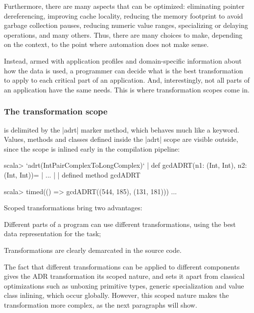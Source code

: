 Furthermore, there are many aspects that can be optimized: eliminating pointer dereferencing, improving cache locality, reducing the memory footprint to avoid garbage collection pauses, reducing numeric value ranges, specializing or delaying operations, and many others. Thus, there are many choices to make, depending on the context, to the point where automation does not make sense.

Instead, armed with application profiles and domain-specific information about how the data is used, a programmer can decide what is the best transformation to apply to each critical part of an application. And, interestingly, not all parts of an application have the same needs. This is where transformation scopes come in.

\subsubsection{The transformation scope} is delimited by the |adrt| marker method, which behaves much like a keyword. Values, methods and classes defined inside the |adrt| scope are visible outside, since the scope is inlined early in the compilation pipeline:

\begin{lstlisting-nobreak}
scala> `adrt(IntPairComplexToLongComplex)` {
       |   def gcdADRT(n1: (Int, Int), n2: (Int, Int))={
       |     ...
       |   }
       | }
defined method gcdADRT

scala> timed(() => gcdADRT((544, 185), (131, 181)))
...
\end{lstlisting-nobreak}

Scoped transformations bring two advantages:

\begin{compactitem}
 \item Different parts of a program can use different transformations, using the best data representation for the task;
 \item Transformations are clearly demarcated in the source code.
\end{compactitem}

The fact that different transformations can be applied to different components gives the ADR transformation its scoped nature, and sets it apart from classical optimizations such as unboxing primitive types, generic specialization and value class inlining, which occur globally. However, this scoped nature makes the transformation more complex, as the next paragraphs will show.

